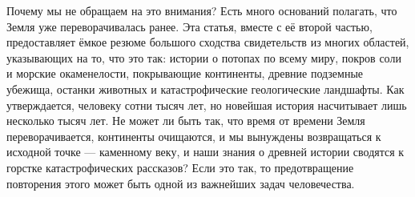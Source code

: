 \documentclass[10pt,twocolumn,letterpaper]{article}
\begin{document}
Почему мы не обращаем на это внимания? Есть много оснований полагать, что Земля уже переворачивалась ранее. Эта статья, вместе с её второй частью, предоставляет ёмкое резюме большого сходства свидетельств из многих областей, указывающих на то, что это так: истории о потопах по всему миру, покров соли и морские окаменелости, покрывающие континенты, древние подземные убежища, останки животных и катастрофические геологические ландшафты. Как утверждается, человеку сотни тысяч лет, но новейшая история насчитывает лишь несколько тысяч лет. Не может ли быть так, что время от времени Земля переворачивается, континенты очищаются, и мы вынуждены возвращаться к исходной точке — каменному веку, и наши знания о древней истории сводятся к горстке катастрофических рассказов? Если это так, то предотвращение повторения этого может быть одной из важнейших задач человечества.
\end{document}
